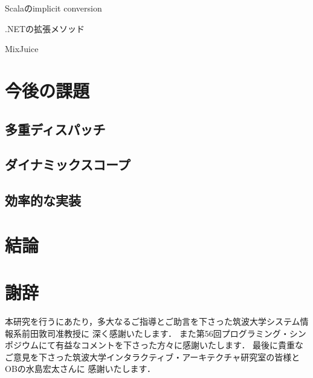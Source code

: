 \documentclass[a4paper,11pt,dvipdfmx]{jreport}
\makeatletter
\renewenvironment{thebibliography}[1]%
{\chapter*{\bibname\@mkboth{\bibname}{\bibname}}%
	\addcontentsline{toc}{chapter}{\numberline{}\bibname}%
	\list{\@biblabel{\@arabic\c@enumiv}}%
	{\settowidth\labelwidth{\@biblabel{#1}}%
		\leftmargin\labelwidth
		\advance\leftmargin\labelsep
		\@openbib@code
		\usecounter{enumiv}%
		\let\p@enumiv\@empty
		\renewcommand\theenumiv{\@arabic\c@enumiv}}%
	\sloppy
	\clubpenalty4000
	\@clubpenalty\clubpenalty
	\widowpenalty4000%
	\sfcode`\.\@m}
{\def\@noitemerr
	{\@latex@warning{Empty `thebibliography' environment}}%
	\endlist}
\makeatother
\begin{document}
Scalaのimplicit conversion

.NETの拡張メソッド

MixJuice


\chapter{今後の課題}
\label{chapter:future-work}

\section{多重ディスパッチ}

\section{ダイナミックスコープ}

\section{効率的な実装}


\chapter{結論}
\label{chapter:conclusion}


\chapter*{謝辞}

本研究を行うにあたり，多大なるご指導とご助言を下さった筑波大学システム情報系前田敦司准教授に
深く感謝いたします．
また第56回プログラミング・シンポジウムにて有益なコメントを下さった方々に感謝いたします．
最後に貴重なご意見を下さった筑波大学インタラクティブ・アーキテクチャ研究室の皆様とOBの水島宏太さんに
感謝いたします．

\newpage

\renewcommand{\bibname}{参考文献}




%
%
\end{document}

